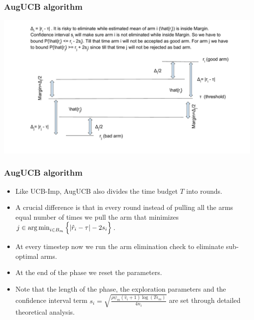 \begin{frame}
\frametitle{AugUCB algorithm}
\includegraphics[scale=0.3]{img/SeminarThresholdBandit}
\end{frame}

\begin{frame}
\frametitle{AugUCB algorithm}
\begin{itemize}
\item<1-> Like UCB-Imp, AugUCB also divides the time budget $T$ into rounds.
\item<2-> A crucial difference is that in every round instead of pulling all the arms equal number of times we pull the arm that minimizes $j\in\operatorname*{arg\,min}_{i\in B_{m}}\Big\lbrace |\hat{r}_{i} - \tau | - 2s_{i}\Big\rbrace$. 
\item<3-> At every timestep now we run the arm elimination check to eliminate sub-optimal arms.
\item<4-> At the end of the phase we reset the parameters. 
\item<5-> Note that the length of the phase, the exploration parameters and the confidence interval term $s_i  = \sqrt{\frac{\rho\psi_m (\hat{v}_{i}+1) \log ( T \epsilon_{m})}{4 n_{i}}}$ are set through detailed theoretical analysis. 
\end{itemize}
\end{frame}

